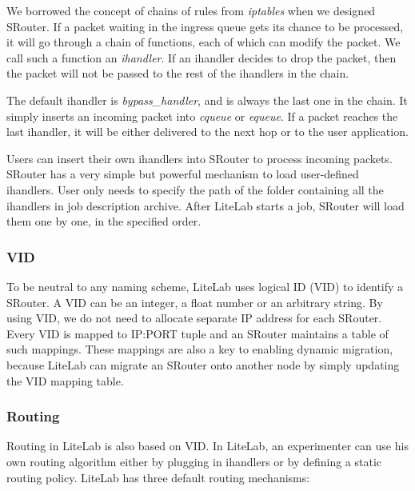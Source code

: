 \documentclass[conference]{IEEEtran}
\begin{document}
We borrowed the concept of chains of rules from \textit{iptables} when
we designed SRouter. If a packet waiting in the ingress queue gets its
chance to be processed, it will go through a chain of functions, each
of which can modify the packet. We call such a function an
\textit{ihandler}. If an ihandler decides to drop the packet, then the
packet will not be passed to the rest of the ihandlers in the chain.

The default ihandler is \textit{bypass\_handler}, and is always the
last one in the chain. It simply inserts an incoming packet into
\textit{cqueue} or \textit{equeue}. If a packet reaches the last
ihandler, it will be either delivered to the next hop or to the user
application.

Users can insert their own ihandlers into SRouter to process incoming
packets. SRouter has a very simple but powerful mechanism to load
user-defined ihandlers. User only needs to specify the path of the
folder containing all the ihandlers in job description archive. After
LiteLab starts a job, SRouter will load them one by one, in the
specified order. 

\subsubsection{VID}

To be neutral to any naming scheme, LiteLab uses logical ID (VID) to
identify a SRouter. A VID can be an integer, a float number or an
arbitrary string. By using VID, we do not need to allocate separate IP
address for each SRouter. Every VID is mapped to IP:PORT tuple
and an SRouter maintains a table of such mappings. These mappings are
also a key to enabling dynamic migration, because LiteLab can migrate
an SRouter onto another node by simply updating the VID mapping table.








\subsubsection{Routing}
Routing in LiteLab is also based on VID. In LiteLab, an experimenter
can use his own routing algorithm either by plugging in ihandlers or
by defining a static routing policy.
LiteLab has three default routing mechanisms:
\end{document}
